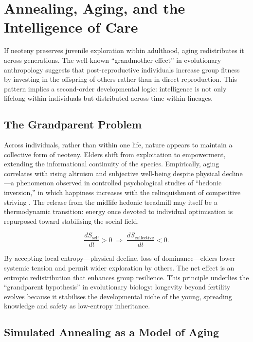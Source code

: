 \documentclass[12pt,a4paper]{article}
\begin{document}
\section{Annealing, Aging, and the Intelligence of Care}

If neoteny preserves juvenile exploration within adulthood, aging redistributes it across
generations.  The well-known ``grandmother effect'' in evolutionary anthropology
suggests that post-reproductive individuals increase group fitness by investing in the
offspring of others rather than in direct reproduction.
This pattern implies a second-order developmental logic:
intelligence is not only lifelong within individuals but distributed across time within lineages.

\subsection{The Grandparent Problem}

Across individuals, rather than within one life,
nature appears to maintain a collective form of neoteny.
Elders shift from exploitation to empowerment, extending the informational
continuity of the species.
Empirically, aging correlates with rising altruism and subjective well-being
despite physical decline---a phenomenon observed in controlled psychological studies of
``hedonic inversion,'' in which happiness increases with the relinquishment of
competitive striving \citep{carstensen2011emotional}.  
The release from the midlife hedonic treadmill may itself be a thermodynamic
transition: energy once
devoted to individual optimisation is repurposed
toward stabilising the social field.

\[
\frac{dS_{\text{self}}}{dt} > 0
\;\Rightarrow\;
\frac{dS_{\text{collective}}}{dt} < 0.
\]

By accepting local entropy---physical decline, loss of dominance---elders
lower systemic tension and permit wider exploration by others.
The net effect is an entropic redistribution that enhances group resilience.
This principle underlies the ``grandparent hypothesis'' in evolutionary biology:
longevity beyond fertility evolves because it stabilises the developmental niche 
of the young, spreading knowledge and safety as low-entropy inheritance.

\subsection{Simulated Annealing as a Model of Aging}
\end{document}
